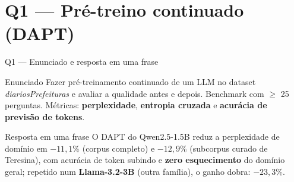 \documentclass[10pt,aspectratio=169]{beamer}
\newcommand{\ganho}[1]{\textcolor{okgreen}{\textbf{#1}}}
\begin{document}
\section{Q1 — Pré-treino continuado (DAPT)}

\begin{frame}{Q1 — Enunciado e resposta em uma frase}
  \begin{block}{Enunciado}
    Fazer pré-treinamento continuado de um LLM no dataset \emph{diariosPrefeituras} e avaliar a qualidade
    antes e depois. Benchmark com $\geq$ 25 perguntas. Métricas: \textbf{perplexidade},
    \textbf{entropia cruzada} e \textbf{acurácia de previsão de tokens}.
  \end{block}
  \vspace{4pt}
  \begin{alertblock}{Resposta em uma frase}
    O DAPT do Qwen2.5-1.5B reduz a perplexidade de domínio em \ganho{$-11{,}1\%$} (corpus completo) e
    \ganho{$-12{,}9\%$} (subcorpus curado de Teresina), com acurácia de token subindo e
    \textbf{zero esquecimento} do domínio geral; repetido num \textbf{Llama-3.2-3B} (outra família),
    o ganho dobra: \ganho{$-23{,}3\%$}.
  \end{alertblock}
\end{frame}
\end{document}
